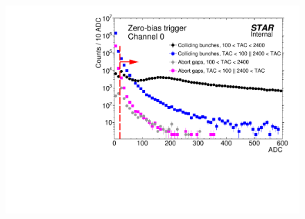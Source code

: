 \begin{figure}[hb]
{  \includegraphics[width=\linewidth,page=21]{graphics/eventSelection/bbc/Bbc_ADC.pdf}
}%
\end{figure}
